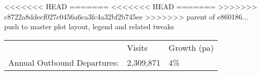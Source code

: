 <<<<<<< HEAD
=======
<<<<<<< HEAD
=======
>>>>>>> c8722a8ddecf027c0456a6ca3fc4a32bf2b745ee
>>>>>>> parent of e860186... push to master plot layout, legend and related tweaks
\begin{tabular}[t]{p{4.8cm}>{\hfill}p{1.3cm}>{\hfill}p{1.4cm}}
   & Visits & Growth (pa) \\ 
 Annual Outbound Departures: & 2,309,871 & 4\% \\ 
  \end{tabular}
